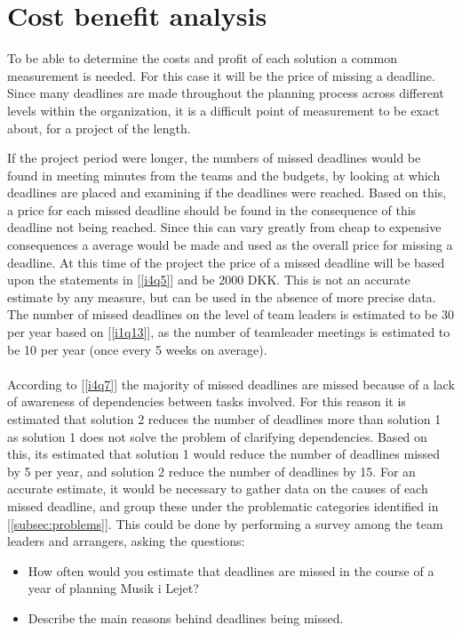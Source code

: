 \section{Cost benefit analysis} %
\label{sec:cost_benefit_analysis}
To be able to determine the costs and profit of each solution a common measurement is needed. For this case it will be the price of missing a deadline. Since many deadlines are made throughout the planning process across different levels within the organization, it is a difficult point of measurement to be exact about, for a project of the length.

If the project period were longer, the numbers of missed deadlines would be found in meeting minutes from the teams and the budgets, by looking at which deadlines are placed and examining if the deadlines were reached. Based on this, a price for each missed deadline should be found in the consequence of this deadline not being reached. Since this can vary greatly from cheap to expensive consequences a average would be made and used as the overall price for missing a deadline. At this time of the project the price of a missed deadline will be based upon the statements in [\ref{i4q5}] and be 2000 DKK. This is not an accurate estimate by any measure, but can be used in the absence of more precise data. The number of missed deadlines on the level of team leaders is estimated to be 30 per year based on [\ref{i1q13}], as the number of teamleader meetings is estimated to be 10 per year (once every 5 weeks on average).
\\ \\
According to [\ref{i4q7}] the majority of missed deadlines are missed because of a lack of awareness
of dependencies between tasks involved. For this reason it is estimated that solution 2 reduces the
number of deadlines more than solution 1 as solution 1 does not solve the problem of clarifying
dependencies. Based on this, its estimated that solution 1 would reduce the number of deadlines
missed by 5 per year, and solution 2 reduce the number of deadlines by 15. For an accurate estimate,
it would be necessary to gather data on the causes of each missed deadline, and group these under
the problematic categories identified in [\ref{subsec:problems}]. This could be done by performing a survey among the team leaders and arrangers, asking the questions:
\begin{itemize}
\item How often would you estimate that deadlines are missed in the course of a year of planning Musik i Lejet?
\item Describe the main reasons behind deadlines being missed.
\end{itemize}
